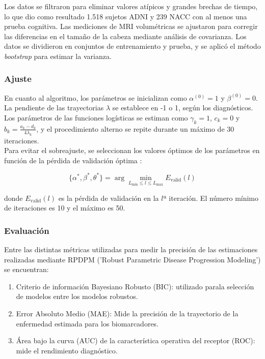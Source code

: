Los datos se filtraron para eliminar valores atípicos y grandes brechas de tiempo, lo que dio como resultado 1.518 sujetos ADNI y 239 NACC con al menos una prueba cognitiva. Las mediciones de MRI volumétricas se ajustaron para corregir las diferencias en el tamaño de la cabeza mediante análisis de covarianza. Los datos se dividieron en conjuntos de entrenamiento y prueba, y se aplicó el método \textit{bootstrap} para estimar la varianza.

\subsubsection{Ajuste}
En cuanto al algoritmo, los parámetros se inicializan como \(\alpha^{(0)} = 1\) y \(\beta^{(0)} = 0\). La pendiente de las trayectorias \(\lambda\) se establece en -1 o 1, según los diagnósticos. Los parámetros de las funciones logísticas se estiman como \(\gamma_k = 1\), \(c_k = 0\) y \(b_k = \frac{a_k - d_k}{4 \lambda_k}\), y el procedimiento alterno se repite durante un máximo de 30 iteraciones.\\

Para evitar el sobreajuste, se seleccionan los valores óptimos de los parámetros en función de la pérdida de validación óptima \cite{prechelt2002early}:

\begin{equation}
	\{\alpha^*, \beta^*, \theta^*\} = \arg\min_{L_{\text{min}} \leq l \leq L_{\text{max}}} E_{\text{valid}}(l)
\end{equation}

donde \(E_{\text{valid}}(l)\) es la pérdida de validación en la \(l\)ª iteración. El número mínimo de iteraciones es 10 y el máximo es 50.

\subsubsection{Evaluación}
Entre las distintas métricas utilizadas para medir la precisión de las estimaciones realizadas mediante RPDPM ('Robust Parametric Disease Progression Modeling') se encuentran: 
\begin{enumerate}
	\item Criterio de información Bayesiano Robusto (BIC): utilizado parala selección de modelos entre los modelos robustos. \cite{9225726}
	\item Error Absoluto Medio (MAE): Mide la precisión de la trayectorio de la enfermedad estimada para los biomarcadores.
	\item Área  bajo la curva (AUC) de la característica operativa del receptor (ROC): mide el rendimiento diagnóstico.
\end{enumerate}

